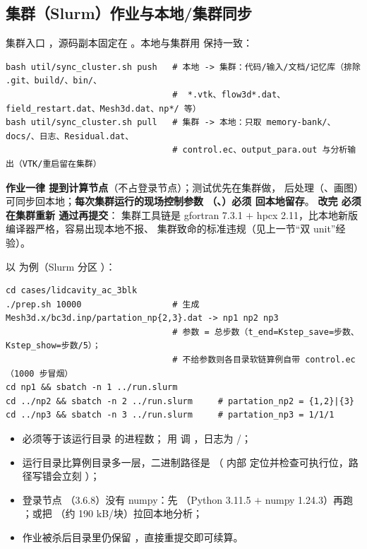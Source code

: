 \subsection{集群（Slurm）作业与本地/集群同步}
集群入口 ，源码副本固定在
。本地与集群用
 保持一致：
\begin{lstlisting}
bash util/sync_cluster.sh push   # 本地 -> 集群：代码/输入/文档/记忆库（排除 .git、build/、bin/、
                                 #  *.vtk、flow3d*.dat、field_restart.dat、Mesh3d.dat、np*/ 等）
bash util/sync_cluster.sh pull   # 集群 -> 本地：只取 memory-bank/、docs/、日志、Residual.dat、
                                 # control.ec、output_para.out 与分析输出（VTK/重启留在集群）
\end{lstlisting}
\textbf{作业一律  提到计算节点}（不占登录节点）；测试优先在集群做，
后处理（、画图）可同步回本地；\textbf{每次集群运行的现场控制参数
（、）必须  回本地留存}。
\textbf{改完  必须在集群重新  通过再提交}：
集群工具链是 gfortran 7.3.1 $+$ hpcx 2.11，比本地新版编译器严格，容易出现本地不报、
集群致命的标准违规（见上一节“双 unit”经验）。

以  为例（Slurm 分区 ）：
\begin{lstlisting}
cd cases/lidcavity_ac_3blk
./prep.sh 10000                  # 生成 Mesh3d.x/bc3d.inp/partation_np{2,3}.dat -> np1 np2 np3
                                 # 参数 = 总步数（t_end=Kstep_save=步数、Kstep_show=步数/5）；
                                 # 不给参数则各目录软链算例自带 control.ec（1000 步冒烟）
cd np1 && sbatch -n 1 ../run.slurm
cd ../np2 && sbatch -n 2 ../run.slurm     # partation_np2 = {1,2}|{3}
cd ../np3 && sbatch -n 3 ../run.slurm     # partation_np3 = 1/1/1
\end{lstlisting}
\begin{itemize}
  \item {} 必须等于该运行目录  的进程数；
        用  调 ，日志为 /；
  \item 运行目录比算例目录多一层，二进制路径是 
        （ 内部  定位并检查可执行位，路径写错会立刻
        ）；
  \item 登录节点 （3.6.8）没有 numpy：先
        （Python 3.11.5 $+$ numpy 1.24.3）再跑
        ；或把 （约 190 kB/块）拉回本地分析；
  \item 作业被杀后目录里仍保留 ，直接重提交即可续算。
\end{itemize}

